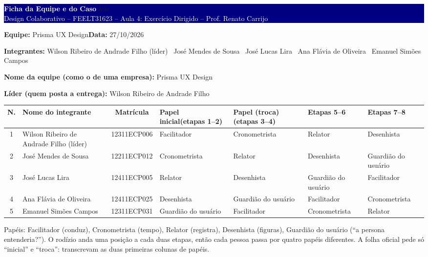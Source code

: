 \documentclass[10pt,a4paper]{article}
\newcommand{\equipenome}{Prisma UX Design}
\newcommand{\dataentrega}{27/10/2026}
\newcommand{\integrantes}{Wilson Ribeiro de Andrade Filho (líder) \textbullet\ José Mendes de Sousa \textbullet\ José Lucas Lira \textbullet\ Ana Flávia de Oliveira \textbullet\ Emanuel Simões Campos}
\newcommand{\folha}[2]{%
  \noindent
  \colorbox{navy}{\parbox{\dimexpr\linewidth-2\fboxsep\relax}{%
    \vspace{3pt}%
    \textcolor{white}{\bfseries\large #1}\hfill
    \ifx&#2&\else\colorbox{laranja}{\textcolor{white}{\bfseries\small #2}}\fi\\[1pt]
    \textcolor{white}{\scriptsize Design Colaborativo -- FEELT31623 -- Aula 4: Exercício Dirigido -- Prof. Renato Carrijo}%
    \vspace{3pt}}}%
  \par\vspace{5pt}
  {\small\textbf{Equipe:} \equipenome\hfill\textbf{Data:} \dataentrega\par}
  {\scriptsize\color{subtle}\textbf{Integrantes:} \integrantes\par}
  \vspace{4pt}}
\begin{document}
\folha{Ficha da Equipe e do Caso}{}

{\small
\textbf{Nome da equipe (como o de uma empresa):} \equipenome\par\vspace{2pt}
\textbf{Líder (quem posta a entrega):} Wilson Ribeiro de Andrade Filho\par}
\vspace{6pt}

{\footnotesize\renewcommand{\arraystretch}{1.35}%
\noindent
\begin{tabularx}{\linewidth}{|c|>{\raggedright\arraybackslash}X|c|>{\centering\arraybackslash}p{2.15cm}|>{\centering\arraybackslash}p{2.15cm}|>{\centering\arraybackslash}p{2.15cm}|>{\centering\arraybackslash}p{2.15cm}|}
\hline
\rowcolor{secbg}\bfseries N. & \bfseries Nome do integrante & \bfseries Matrícula & \bfseries Papel inicial\newline(etapas 1--2) & \bfseries Papel (troca)\newline(etapas 3--4) & \bfseries Etapas 5--6 & \bfseries Etapas 7--8 \\ \hline
1 & Wilson Ribeiro de Andrade Filho (líder) & 12311ECP006 & Facilitador & Cronometrista & Relator & Desenhista \\ \hline
2 & José Mendes de Sousa & 12211ECP012 & Cronometrista & Relator & Desenhista & Guardião do usuário \\ \hline
3 & José Lucas Lira & 12411ECP005 & Relator & Desenhista & Guardião do usuário & Facilitador \\ \hline
4 & Ana Flávia de Oliveira & 12411ECP025 & Desenhista & Guardião do usuário & Facilitador & Cronometrista \\ \hline
5 & Emanuel Simões Campos & 12311ECP031 & Guardião do usuário & Facilitador & Cronometrista & Relator \\ \hline
\end{tabularx}\par}
\vspace{2pt}
{\scriptsize\color{subtle}Papéis: Facilitador (conduz), Cronometrista (tempo), Relator (registra), Desenhista (figuras), Guardião do usuário (``a persona entenderia?''). O rodízio anda uma posição a cada duas etapas, então cada pessoa passa por quatro papéis diferentes. A folha oficial pede só ``inicial'' e ``troca'': transcrevam as duas primeiras colunas de papéis.\par}
\end{document}
